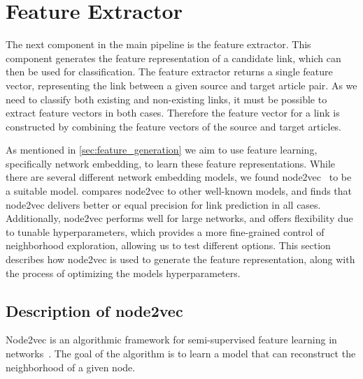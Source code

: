 \section{Feature Extractor}\label{feature_extractor}
The next component in the main pipeline is the feature extractor. This component generates the feature representation of a candidate link, which can then be used for classification.  The feature extractor returns a single feature vector, representing the link between a given source and target article pair. As we need to classify both existing and non-existing links, it must be possible to extract feature vectors in both cases. Therefore the feature vector for a link is constructed by combining the feature vectors of the source and target articles.

As mentioned in \cref{sec:feature_generation} we aim to use feature learning, specifically network embedding, to learn these feature representations. While there are several different network embedding models, we found node2vec~\cite{node2vec} to be a suitable model. \cite{node2vec} compares node2vec to other well-known models, and finds that node2vec delivers better or equal precision for link prediction in all cases. Additionally, node2vec performs well for large networks, and offers flexibility due to tunable hyperparameters, which provides a more fine-grained control of neighborhood exploration, allowing us to test different options. This section describes how node2vec is used to generate the feature representation, along with the process of optimizing the models hyperparameters. 

\subsection{Description of node2vec} %
\label{sec:node2vec}
Node2vec is an algorithmic framework for semi-supervised feature learning in networks~\cite{node2vec}. The goal of the algorithm is to learn a model that can reconstruct the neighborhood of a given node.


